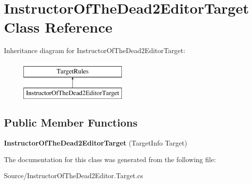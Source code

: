 \hypertarget{class_instructor_of_the_dead2_editor_target}{}\section{Instructor\+Of\+The\+Dead2\+Editor\+Target Class Reference}
\label{class_instructor_of_the_dead2_editor_target}
Inheritance diagram for Instructor\+Of\+The\+Dead2\+Editor\+Target\+:\begin{figure}[H]
\begin{center}
\leavevmode
\includegraphics[height=2.000000cm]{class_instructor_of_the_dead2_editor_target}
\end{center}
\end{figure}
\subsection*{Public Member Functions}
\begin{DoxyCompactItemize}
\item 
\mbox{\label{class_instructor_of_the_dead2_editor_target_a9572722a42cc5e7057e9e3ba5019c912}} 
{\bfseries Instructor\+Of\+The\+Dead2\+Editor\+Target} (Target\+Info Target)
\end{DoxyCompactItemize}


The documentation for this class was generated from the following file\+:\begin{DoxyCompactItemize}
\item 
Source/Instructor\+Of\+The\+Dead2\+Editor.\+Target.\+cs\end{DoxyCompactItemize}
